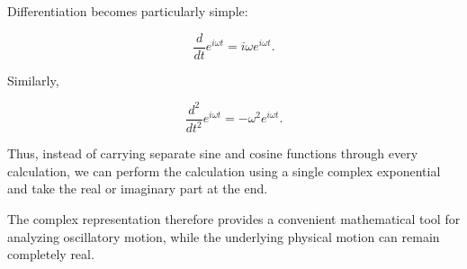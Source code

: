 \documentclass[12pt]{article}
\theoremstyle{remark}
\begin{document}
Differentiation becomes particularly simple:

\[
\frac{d}{dt}e^{i\omega t}
=
i\omega e^{i\omega t}.
\]

Similarly,

\[
\frac{d^2}{dt^2}e^{i\omega t}
=
-\omega^2e^{i\omega t}.
\]

Thus, instead of carrying separate sine and cosine functions through every calculation, we can perform the calculation using a single complex exponential and take the real or imaginary part at the end.

The complex representation therefore provides a convenient mathematical tool for analyzing oscillatory motion, while the underlying physical motion can remain completely real.
\end{document}
